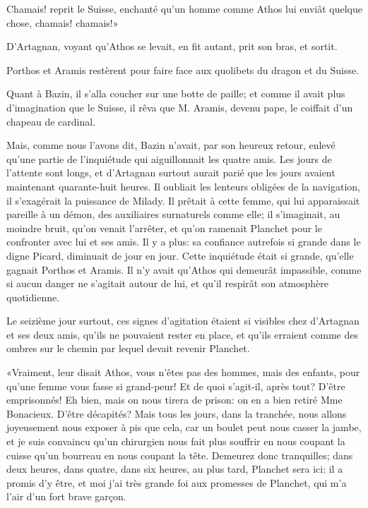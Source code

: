 \speak  Chamais! reprit le Suisse, enchanté qu'un homme comme Athos lui enviât quelque chose, chamais! chamais!» 

D'Artagnan, voyant qu'Athos se levait, en fit autant, prit son bras, et sortit. 

Porthos et Aramis restèrent pour faire face aux quolibets du dragon et du Suisse. 

Quant à Bazin, il s'alla coucher sur une botte de paille; et comme il avait plus d'imagination que le Suisse, il rêva que M. Aramis, devenu pape, le coiffait d'un chapeau de cardinal. 

Mais, comme nous l'avons dit, Bazin n'avait, par son heureux retour, enlevé qu'une partie de l'inquiétude qui aiguillonnait les quatre amis. Les jours de l'attente sont longs, et d'Artagnan surtout aurait parié que les jours avaient maintenant quarante-huit heures. Il oubliait les lenteurs obligées de la navigation, il s'exagérait la puissance de Milady. Il prêtait à cette femme, qui lui apparaissait pareille à un démon, des auxiliaires surnaturels comme elle; il s'imaginait, au moindre bruit, qu'on venait l'arrêter, et qu'on ramenait Planchet pour le confronter avec lui et ses amis. Il y a plus: sa confiance autrefois si grande dans le digne Picard, diminuait de jour en jour. Cette inquiétude était si grande, qu'elle gagnait Porthos et Aramis. Il n'y avait qu'Athos qui demeurât impassible, comme si aucun danger ne s'agitait autour de lui, et qu'il respirât son atmosphère quotidienne. 

Le seizième jour surtout, ces signes d'agitation étaient si visibles chez d'Artagnan et ses deux amis, qu'ils ne pouvaient rester en place, et qu'ils erraient comme des ombres sur le chemin par lequel devait revenir Planchet. 

«Vraiment, leur disait Athos, vous n'êtes pas des hommes, mais des enfants, pour qu'une femme vous fasse si grand-peur! Et de quoi s'agit-il, après tout? D'être emprisonnés! Eh bien, mais on nous tirera de prison: on en a bien retiré Mme Bonacieux. D'être décapités? Mais tous les jours, dans la tranchée, nous allons joyeusement nous exposer à pis que cela, car un boulet peut nous casser la jambe, et je suis convaincu qu'un chirurgien nous fait plus souffrir en nous coupant la cuisse qu'un bourreau en nous coupant la tête. Demeurez donc tranquilles; dans deux heures, dans quatre, dans six heures, au plus tard, Planchet sera ici: il a promis d'y être, et moi j'ai très grande foi aux promesses de Planchet, qui m'a l'air d'un fort brave garçon. 

